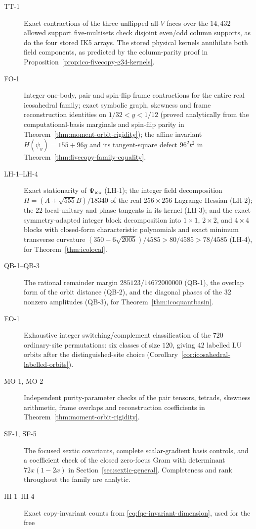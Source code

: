 \begin{description}
\item[TT-1] Exact contractions of the three unflipped all-$V$ faces over the
$14{,}432$ allowed support five-multisets check disjoint even/odd column supports,
as do the four stored IK5 arrays. The stored physical kernels annihilate both
field components, as predicted by the column-parity proof in
Proposition~\ref{prop:ico-fivecopy-g34-kernels}.
\item[FO-1] Integer one-body, pair and spin-flip frame contractions for the entire real icosahedral
family; exact symbolic graph, skewness and frame reconstruction identities on $1/32<y<1/12$ (proved analytically from the computational-basis marginals and spin-flip parity in Theorem~\ref{thm:moment-orbit-rigidity}); the affine invariant $H(\psi_y)=155+96y$ and its tangent-square defect $96^2t^2$ in Theorem~\ref{thm:fivecopy-family-equality}.
\item[LH-1--LH-4] Exact stationarity of $\Psi_{\mathrm{ico}}$ (LH-1); the integer field decomposition $H=(A+\sqrt{555}B)/18340$
of the real $256\times256$ Lagrange Hessian (LH-2); the $22$ local-unitary and phase tangents in its kernel (LH-3);
and the exact symmetry-adapted integer block decomposition into $1\times1$, $2\times2$, and $4\times4$ blocks with
closed-form characteristic polynomials and exact minimum transverse curvature $(350-6\sqrt{2005})/4585>80/4585>78/4585$
(LH-4), for Theorem~\ref{thm:icolocal}.
\item[QB-1--QB-3] The rational remainder margin $285123/14672000000$ (QB-1), the overlap form of the orbit distance (QB-2),
and the diagonal phases of the $32$ nonzero amplitudes (QB-3), for Theorem~\ref{thm:icoquantbasin}.
\item[EO-1] Exhaustive integer switching/complement classification of the $720$ ordinary-site
permutations: six classes of size $120$, giving $42$ labelled LU orbits after the distinguished-site
choice (Corollary~\ref{cor:icosahedral-labelled-orbits}).
\item[MO-1, MO-2] Independent purity-parameter checks of the pair tensors, tetrads, skewness arithmetic, frame overlaps and reconstruction coefficients in Theorem~\ref{thm:moment-orbit-rigidity}.
\item[SF-1, SF-5] The focused sextic covariants, complete scalar-gradient basis controls,
and a coefficient check of the closed zero-focus Gram with determinant $72x(1-2x)$
in Section~\ref{sec:sextic-general}. Completeness and rank throughout the family are analytic.
\item[HI-1--HI-4] Exact copy-invariant counts from \eqref{eq:fqe-invariant-dimension}, used for the free

\end{description}
